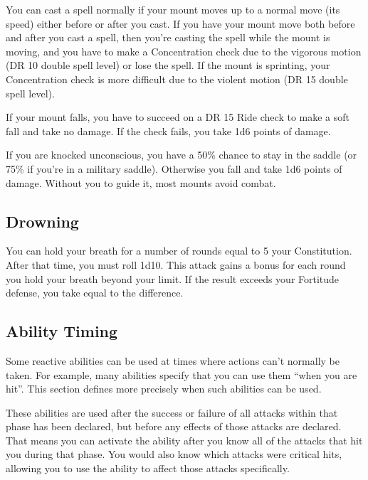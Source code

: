         You can cast a spell normally if your mount moves up to a normal move (its speed) either before or after you cast. If you have your mount move both before and after you cast a spell, then you're casting the spell while the mount is moving, and you have to make a Concentration check due to the vigorous motion (DR 10 \add double spell level) or lose the spell. If the mount is sprinting, your Concentration check is more difficult due to the violent motion (DR 15 \add double spell level).

         If your mount falls, you have to succeed on a DR 15 Ride check to make a soft fall and take no damage. If the check fails, you take 1d6 points of damage.

         If you are knocked unconscious, you have a 50\% chance to stay in the saddle (or 75\% if you're in a military saddle). Otherwise you fall and take 1d6 points of damage. Without you to guide it, most mounts avoid combat.

    \subsection{Drowning}\label{Drowning}
        You can hold your breath for a number of rounds equal to 5 \add your Constitution.
        After that time, you must roll 1d10.
        This attack gains a  bonus for each round you hold your breath beyond your limit.
        If the result exceeds your Fortitude defense, you take  equal to the difference.

    \subsection{Ability Timing}
        Some reactive abilities can be used at times where actions can't normally be taken.
        For example, many abilities specify that you can use them ``when you are hit''.
        This section defines more precisely when such abilities can be used.

         These abilities are used after the success or failure of all attacks within that phase has been declared, but before any effects of those attacks are declared.
        That means you can activate the ability after you know all of the attacks that hit you during that phase.
        You would also know which attacks were critical hits, allowing you to use the ability to affect those attacks specifically.

